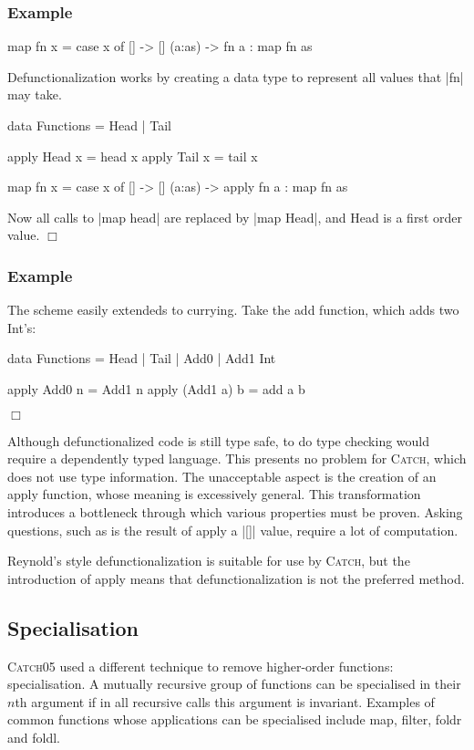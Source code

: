 \documentclass[preprint]{sigplanconf}
\newcommand{\C}[1]{\textsf{#1}}
\newcommand{\catch}{\textsc{Catch}}
\newcounter{exmp}
\newcommand{\yesexample}{\subsubsection*{Example \arabic{exmp}}\addtocounter{exmp}{1}}
\newcommand{\noexample}{\hfill$\Box$}
\newenvironment{example}{\yesexample}{\noexample}
\begin{document}
\begin{example}
\begin{code}
map fn x = case  x of
                 []      -> []
                 (a:as)  -> fn a : map fn as
\end{code}

Defunctionalization works by creating a data type to represent all values that |fn| may take.

\begin{code}
data Functions = Head | Tail

apply Head  x = head  x
apply Tail  x = tail  x

map fn x = case  x of
                 []      -> []
                 (a:as)  -> apply fn a : map fn as
\end{code}

Now all calls to |map head| are replaced by |map Head|, and \C{Head} is a first order value.
\end{example}

\begin{example}
The scheme easily extendeds to currying. Take the \C{add} function, which adds two \C{Int}'s:

\begin{code}
data Functions = Head | Tail | Add0 | Add1 Int

apply Add0      n  = Add1 n
apply (Add1 a)  b  = add a b
\end{code}
\end{example}

Although defunctionalized code is still type safe, to do type checking would require a dependently typed language. This presents no problem for \catch{}, which does not use type information. The unacceptable aspect is the creation of an \C{apply} function, whose meaning is excessively general. This transformation introduces a bottleneck through which various properties must be proven. Asking questions, such as is the result of \C{apply} a |[]| value, require a lot of computation.

Reynold's style defunctionalization is suitable for use by \catch{}, but the introduction of \C{apply} means that defunctionalization is not the preferred method.

\subsection{Specialisation}

\catch05 used a different technique to remove higher-order functions: specialisation. A mutually recursive group of functions can be specialised in their $n$th argument if in all recursive calls this argument is invariant. Examples of common functions whose applications can be specialised include \C{map}, \C{filter}, \C{foldr} and \C{foldl}.
\end{document}
